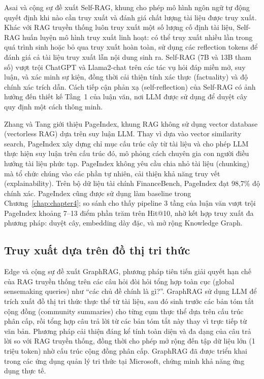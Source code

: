 Asai và cộng sự \cite{asai2024selfrag} đề xuất Self-RAG, khung cho phép mô hình
ngôn ngữ tự động quyết định khi nào cần truy xuất và đánh giá chất lượng tài liệu
được truy xuất. Khác với RAG truyền thống luôn truy xuất một số lượng cố định tài
liệu, Self-RAG huấn luyện mô hình truy xuất linh hoạt: có thể truy xuất nhiều lần
trong quá trình sinh hoặc bỏ qua truy xuất hoàn toàn, sử dụng các reflection tokens
để đánh giá cả tài liệu truy xuất lẫn nội dung sinh ra. Self-RAG (7B và 13B tham
số) vượt trội ChatGPT và Llama2-chat trên các tác vụ hỏi đáp miền mở, suy luận,
và xác minh sự kiện, đồng thời cải thiện tính xác thực (factuality) và độ chính xác
trích dẫn. Cách tiếp cận phản xạ (self-reflection) của Self-RAG có ảnh hưởng đến
thiết kế Tầng~1 của luận văn, nơi LLM được sử dụng để duyệt cây quy định một cách
thông minh.

Zhang và Tang \cite{zhang2025pageindex} giới thiệu PageIndex, khung RAG không sử
dụng vector database (vectorless RAG) dựa trên suy luận LLM. Thay vì dựa vào vector
similarity search, PageIndex xây dựng chỉ mục cấu trúc cây từ tài liệu và cho phép
LLM thực hiện suy luận trên cấu trúc đó, mô phỏng cách chuyên gia con người điều
hướng tài liệu phức tạp. PageIndex không yêu cầu chia nhỏ tài liệu (chunking) mà
tổ chức chúng vào các phần tự nhiên, cải thiện khả năng truy vết (explainability).
Trên bộ dữ liệu tài chính FinanceBench, PageIndex đạt 98,7\% độ chính xác. PageIndex
cũng được sử dụng làm baseline trong Chương~\ref{chap:chapter4}; so sánh cho thấy
pipeline 3 tầng của luận văn vượt trội PageIndex khoảng 7--13 điểm phần trăm trên
Hit@10, nhờ kết hợp truy xuất đa phương pháp: duyệt cây, embedding dày đặc, và mở
rộng Knowledge Graph.

\subsection{Truy xuất dựa trên đồ thị tri thức}
\label{subsec:graph-rag}

Edge và cộng sự \cite{edge2024graphrag} đề xuất GraphRAG, phương pháp tiên tiến
giải quyết hạn chế của RAG truyền thống trên các câu hỏi đòi hỏi tổng hợp toàn
cục (global sensemaking queries) như ``các chủ đề chính là gì?''. GraphRAG sử dụng
LLM để trích xuất đồ thị tri thức thực thể từ tài liệu, sau đó sinh trước các bản
tóm tắt cộng đồng (community summaries) cho từng cụm thực thể dựa trên cấu trúc
phân cấp, rồi tổng hợp câu trả lời từ các bản tóm tắt này thay vì trực tiếp từ
văn bản. Phương pháp cải thiện đáng kể tính toàn diện và đa dạng của câu trả lời
so với RAG truyền thống, đồng thời cho phép mở rộng đến tập dữ liệu lớn (1 triệu
token) nhờ cấu trúc cộng đồng phân cấp. GraphRAG đã được triển khai trong các ứng
dụng quản lý tri thức tại Microsoft, chứng minh khả năng ứng dụng thực tế.


